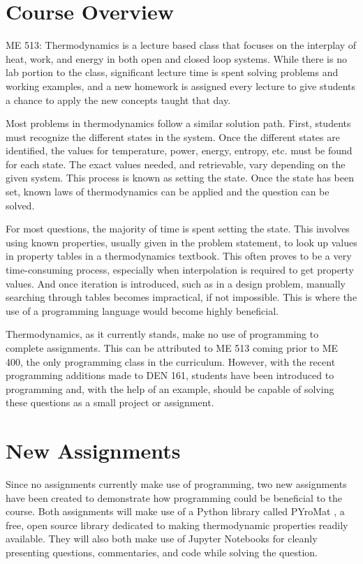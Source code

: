 \section{Course Overview}

ME 513: Thermodynamics is a lecture based class that focuses on the interplay of heat, work, and energy in both
open and closed loop systems. While there is no lab portion to the class, significant lecture time is spent
solving problems and working examples, and a new homework is assigned every lecture to give students a chance
to apply the new concepts taught that day.

Most problems in thermodynamics follow a similar solution path. First, students must recognize the different
states in the system. Once the different states are identified, the values for temperature, power, energy,
entropy, etc. must be found for each state. The exact values needed, and retrievable, vary depending on the
given system. This process is known as setting the state. Once the state has been set, known laws of
thermodynamics can be applied and the question can be solved.

For most questions, the majority of time is spent setting the state. This involves using known properties, 
usually given in the problem statement, to look up values in property tables in a thermodynamics textbook. 
This often proves to be a very time-consuming process, especially when interpolation is required to get 
property values. And once iteration is introduced, such as in a design problem, manually searching through
tables becomes impractical, if not impossible. This is where the use of a programming language would become 
highly beneficial.

Thermodynamics, as it currently stands, make no use of programming to complete assignments.
This can be attributed to ME 513 coming prior to ME 400, the only programming class in the 
curriculum. However, with the recent programming additions made to DEN 161, students have been introduced
to programming and, with the help of an example, should be capable of solving these questions as a small
project or assignment.

\section{New Assignments}

Since no assignments currently make use of programming, two new assignments have been created to demonstrate
how programming could be beneficial to the course. Both assignments will make use of a Python library called
PYroMat \cite{chris_martin_2022_7262173}, a free, open source library dedicated to making thermodynamic properties readily available.
They will also both make use of Jupyter Notebooks for cleanly presenting questions, commentaries, and code
while solving the question.

